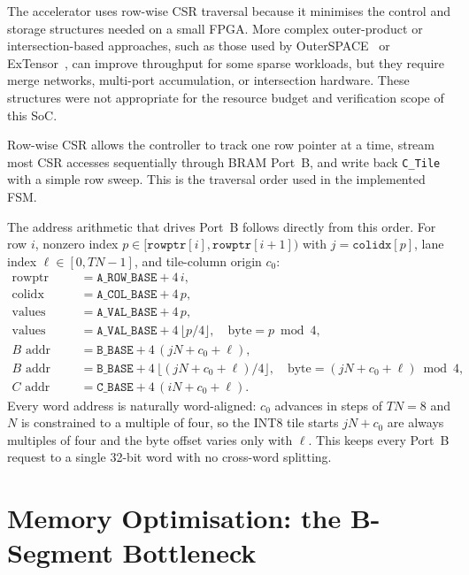 The accelerator uses row-wise CSR traversal because it minimises the
control and storage structures needed on a small FPGA. More complex
outer-product or intersection-based approaches, such as those used by
OuterSPACE~\citep{outerspace2018} or ExTensor~\citep{extensor2019}, can
improve throughput for some sparse workloads, but they require merge
networks, multi-port accumulation, or intersection hardware. These
structures were not appropriate for the resource budget and verification
scope of this SoC.

Row-wise CSR allows the controller to track one row pointer at a time,
stream most CSR accesses sequentially through BRAM Port~B, and write back
\texttt{C\_Tile} with a simple row sweep. This is the traversal order used
in the implemented FSM.

The address arithmetic that drives Port~B follows directly from this
order. For row $i$, nonzero index $p \in
[\texttt{rowptr}[i],\texttt{rowptr}[i{+}1])$ with $j = \texttt{colidx}[p]$,
lane index $\ell \in [0, TN{-}1]$, and tile-column origin $c_0$:
\begin{align*}
\text{rowptr addr}        &= \texttt{A\_ROW\_BASE} + 4\,i, \\
\text{colidx addr}        &= \texttt{A\_COL\_BASE} + 4\,p, \\
\text{values addr (INT32)} &= \texttt{A\_VAL\_BASE} + 4\,p, \\
\text{values addr (INT8)} &= \texttt{A\_VAL\_BASE} + 4\,\lfloor p/4 \rfloor,
                              \quad \text{byte} = p \bmod 4, \\
\text{$B$ addr (INT32)}   &= \texttt{B\_BASE} + 4\,(jN + c_0 + \ell), \\
\text{$B$ addr (INT8)}    &= \texttt{B\_BASE} + 4\,\lfloor (jN + c_0 + \ell)/4 \rfloor,
                              \quad \text{byte} = (jN + c_0 + \ell) \bmod 4, \\
\text{$C$ addr}           &= \texttt{C\_BASE} + 4\,(iN + c_0 + \ell).
\end{align*}
Every word address is naturally word-aligned: $c_0$ advances in steps
of $TN = 8$ and $N$ is constrained to a multiple of four, so the INT8
tile starts $jN + c_0$ are always multiples of four and the byte
offset varies only with $\ell$. This keeps every Port~B request to a
single 32-bit word with no cross-word splitting.

\section{Memory Optimisation: the B-Segment Bottleneck}
\label{sec:bseg}


